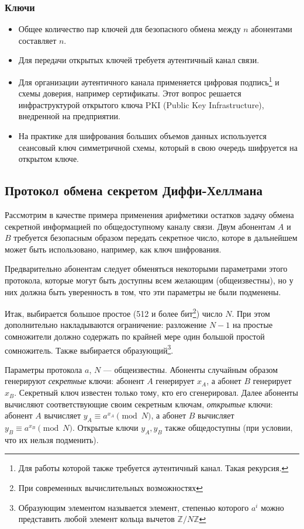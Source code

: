 \begin{frame}
    \frametitle{Ключи}
    
    \begin{itemize}
        \item Общее количество пар ключей для безопасного обмена между $n$ абонентами составляет $n$.
        \item Для передачи открытых ключей требуетя \alert{аутентичный} канал связи.
        \item Для организации аутентичного канала применяется цифровая подпись\footnote{Для работы которой также требуется аутентичный канал. Такая рекурсия.} и схемы доверия, например сертификаты. Этот вопрос решается инфраструктурой открытого ключа PKI (Public Key Infrastructure), внедренной на предприятии.
        \item На практике для шифрования больших объемов данных используется сеансовый ключ симметричной схемы, который в свою очередь шифруется на открытом ключе.
    \end{itemize} 
\end{frame}


\subsection{Протокол обмена секретом Диффи-Хеллмана}


Рассмотрим в качестве примера применения арифметики остатков задачу обмена секретной информацией по общедоступному каналу связи. Двум абонентам $A$ и $B$ требуется безопасным образом передать секретное число, которе в дальнейшем может быть использовано, например, как ключ шифрования.

Предварительно абонентам следует обменяться некоторыми параметрами этого протокола, которые могут быть доступны всем желающим (общеизвестны), но у них  должна быть уверенность в том, что эти параметры не были подменены.

Итак, выбирается большое простое (512 и более бит\footnote{При современных вычислительных возможностях}) число $N$. При этом дополнительно накладываются ограничение: разложение $N-1$ на простые сомножители должно содержать по крайней мере один большой простой сомножитель. Также выбирается образующий\footnote{Образующим элементом называется элемент, степенью которого $a^i$ можно представить любой элемент кольца вычетов $\mathbb{Z}/N\mathbb{Z}$}.

Параметры протокола $a$, $N$ --- общеизвестны. Абоненты случайным образом генерируют \emph{секретные} ключи: абонент $A$ генерирует $x_A$, а абонет $B$ генерирует $x_B$. Секретный ключ известен только тому, кто его сгенерировал. Далее абоненты вычисляют соответствующие своим секретным ключам, \emph{открытые} ключи: абонент $A$ вычисляет $y_A\equiv a^{x_A}\pmod{N}$, а абонет $B$ вычисляет $y_B\equiv a^{x_B}\pmod{N}$. Открытые ключи $y_A, y_B$ также общедоступны (при условии, что их нельзя подменить).

